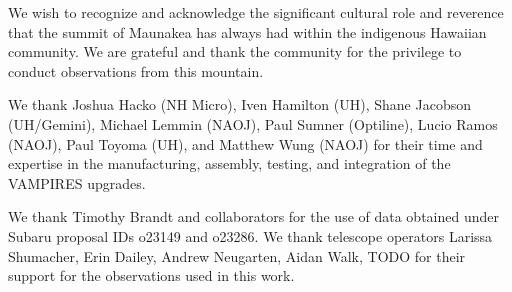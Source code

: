 \begin{acknowledgements}
We wish to recognize and acknowledge the significant cultural role and reverence that the summit of Maunakea has always had within the indigenous Hawaiian community. We are grateful and thank the community for the privilege to conduct observations from this mountain.

We thank Joshua Hacko (NH Micro), Iven Hamilton (UH), Shane Jacobson (UH/Gemini), Michael Lemmin (NAOJ), Paul Sumner (Optiline), Lucio Ramos (NAOJ), Paul Toyoma (UH), and Matthew Wung (NAOJ) for their time and expertise in the manufacturing, assembly, testing, and integration of the VAMPIRES upgrades.

We thank Timothy Brandt and collaborators for the use of data obtained under Subaru proposal IDs o23149 and o23286. We thank telescope operators Larissa Shumacher, Erin Dailey, Andrew Neugarten, Aidan Walk, TODO for their support for the observations used in this work.
\end{acknowledgements}